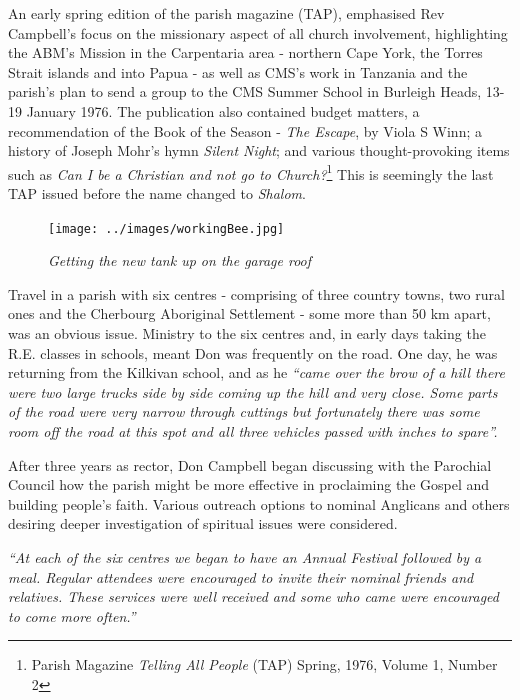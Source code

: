 An early spring edition of the parish magazine (TAP), emphasised Rev Campbell's focus on the missionary aspect of all church involvement, highlighting the ABM's Mission in the Carpentaria area - northern Cape York, the Torres Strait islands and into Papua - as well as CMS's work in Tanzania and the parish's plan to send a group to the CMS Summer School in Burleigh Heads, 13-19 January 1976. The publication also contained budget matters, a recommendation of the Book of the Season - \emph{The Escape}, by Viola S Winn; a history of Joseph Mohr's hymn \emph{Silent Night}; and various thought-provoking items such as \emph{Can I be a Christian and not go to Church?}\footnote{Parish Magazine \emph{Telling All People} (TAP) Spring, 1976, Volume 1, Number 2} This is seemingly the last TAP issued before the name changed to \emph{Shalom}.








\begin{figure}[!htb]
\begin{center}
\texttt{[image: ../images/workingBee.jpg]}
\caption{\itshape Getting the new tank up on the garage roof}
\end{center}
\end{figure}




Travel in a parish with six centres - comprising of three country towns, two rural ones and the Cherbourg Aboriginal Settlement - some more than 50 km apart, was an obvious issue. Ministry to the six centres and, in early days taking the R.E. classes in schools, meant Don was frequently on the road. One day, he was returning from the Kilkivan school, and as he \emph{``came over the brow of a hill there were two large trucks side by side coming up the hill and very close. Some parts of the road were very narrow through cuttings but fortunately there was some room off the road at this spot and all three vehicles passed with inches to spare''.}



After three years as rector, Don Campbell began discussing with the Parochial Council how the parish might be more effective in proclaiming the Gospel and building people's faith. Various outreach options to nominal Anglicans and others desiring deeper investigation of spiritual issues were considered.



\emph{``At each of the six centres we began to have an Annual Festival followed by a meal. Regular attendees were encouraged to invite their nominal friends and relatives. These services were well received and some who came were encouraged to come more often.''}



